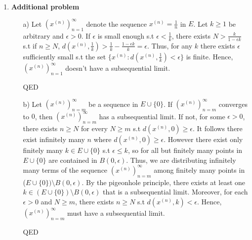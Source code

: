 \documentclass[10pt]{article}
\begin{document}
\begin{enumerate}[label=Problem \arabic*.]
    \item \textbf{Additional problem} \par 
    \begin{itemize}
        \item [a)] Let $(x^{(n)})_{n=1}^{\infty}$ denote the sequence $x^{(n)}=\frac{1}{n}$ in $E$. 
        Let $k\ge 1$ be arbitrary and $\epsilon>0$. 
        If $\epsilon$ is small enough s.t $\epsilon<\frac{1}{k}$, there exists $N>\frac{k}{1-\epsilon k}$ s.t if $n\ge N$, $d(x^{(n)},\frac{1}{k})>\frac{1}{k}-\frac{1-\epsilon k}{k}=\epsilon$. 
        Thus, for any $k$ there exists $\epsilon$ sufficiently small s.t the set $\{x^{(n)}:d(x^{(n)},\frac{1}{k})<\epsilon\}$ is finite. 
        Hence, $(x^{(n)})_{n=1}^{\infty}$ doesn't have a subsequential limit. \par 
        QED
        \item [b)] Let $(x^{(n)})_{n=m}^{\infty}$ be a sequence in $E\cup \{0\}$. If $(x^{(n)})_{n=m}^{\infty}$ converges to $0$, then $(x^{(n)})_{n=m}^{\infty}$ has a subsequential limit. If not, for some $\epsilon>0$, there exists $n\ge N$ for every $N\ge m$ s.t $d(x^{(n)},0)\ge \epsilon$.
        It follows there exist infinitely many $n$ where $d(x^{(n)},0)\ge \epsilon$. 
        However there exist only finitely many $k\in E\cup\{0\}$ s.t $\epsilon\le k$, so for all but finitely many points in $E\cup\{0\}$ are contained in $B(0,\epsilon)$. 
        Thus, we are distributing infinitely many terms of the sequence $(x^{(n)})_{n=m}^{\infty}$ among finitely many points in ($E\cup\{0\})\setminus B(0,\epsilon)$.
        By the pigeonhole principle, there exists at least one $k\in (E\cup\{0\})\setminus B(0,\epsilon)$ that is a subsequential limit.
        Moreover, for each $\epsilon>0$ and $N\ge m$, there exists $n\ge N$ s.t $d(x^{(n)},k)<\epsilon$.
        Hence, $(x^{(n)})_{n=m}^{\infty}$ must have a subsequential limit.
        \par QED
    \end{itemize}

\end{enumerate}
\end{document}
